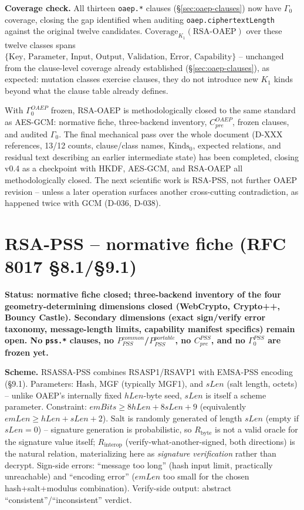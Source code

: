 \documentclass[11pt,a4paper]{article}
\begin{document}
\textbf{Coverage check.} All thirteen \texttt{oaep.*} clauses (\S\ref{sec:oaep-clauses}) now have $\Gamma_0$ coverage, closing the gap identified when auditing \texttt{oaep.ciphertextLength} against the original twelve candidates. $\text{Coverage}_{K_1}(\text{RSA-OAEP})$ over these twelve classes spans $\{\text{Key, Parameter, Input, Output, Validation, Error, Capability}\}$ -- unchanged from the clause-level coverage already established (\S\ref{sec:oaep-clauses}), as expected: mutation classes exercise clauses, they do not introduce new $K_1$ kinds beyond what the clause table already defines.

With $\Gamma_0^{OAEP}$ frozen, RSA-OAEP is methodologically closed to the same standard as AES-GCM: normative fiche, three-backend inventory, $C_{pre}^{OAEP}$, frozen clauses, and audited $\Gamma_0$. The final mechanical pass over the whole document (D-XXX references, 13/12 counts, clause/class names, $\text{Kinds}_0$, expected relations, and residual text describing an earlier intermediate state) has been completed, closing v0.4 as a checkpoint with HKDF, AES-GCM, and RSA-OAEP all methodologically closed. The next scientific work is RSA-PSS, not further OAEP revision -- unless a later operation surfaces another cross-cutting contradiction, as happened twice with GCM (D-036, D-038).

\section{RSA-PSS -- normative fiche (RFC 8017 \S8.1/\S9.1)}\label{sec:pss}
\textbf{Status: normative fiche closed; three-backend inventory of the four geometry-determining dimensions closed (WebCrypto, Crypto++, Bouncy Castle). Secondary dimensions (exact sign/verify error taxonomy, message-length limits, capability manifest specifics) remain open. No \texttt{pss.*} clauses, no $P_{PSS}^{common}$/$P_{PSS}^{portable}$, no $C_{pre}^{PSS}$, and no $\Gamma_0^{PSS}$ are frozen yet.}

\textbf{Scheme.} RSASSA-PSS combines RSASP1/RSAVP1 with EMSA-PSS encoding (\S9.1). Parameters: Hash, MGF (typically MGF1), and $sLen$ (salt length, octets) -- unlike OAEP's internally fixed $hLen$-byte seed, $sLen$ is itself a scheme parameter. Constraint: $emBits \ge 8hLen + 8sLen + 9$ (equivalently $emLen \ge hLen + sLen + 2$). Salt is randomly generated of length $sLen$ (empty if $sLen=0$) -- signature generation is probabilistic, so $R_{\text{byte}}$ is not a valid oracle for the signature value itself; $R_{\text{interop}}$ (verify-what-another-signed, both directions) is the natural relation, materializing here as \emph{signature verification} rather than decrypt. Sign-side errors: ``message too long'' (hash input limit, practically unreachable) and ``encoding error'' ($emLen$ too small for the chosen hash+salt+modulus combination). Verify-side output: abstract ``consistent''/``inconsistent'' verdict.
\end{document}
